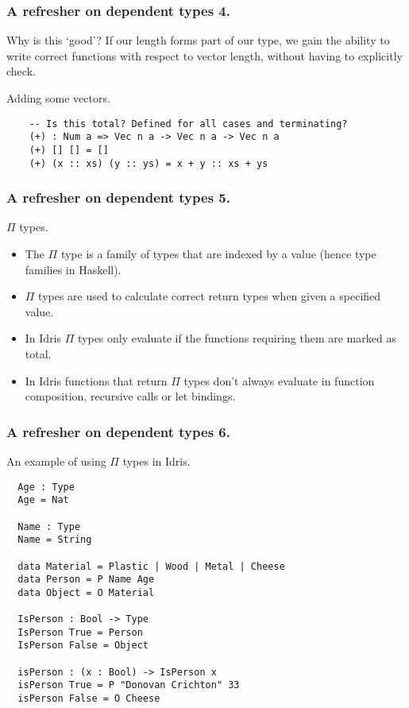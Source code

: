 \documentclass{beamer}
\begin{document}
\begin{frame}[fragile]
  \frametitle{A refresher on dependent types 4.}

  \begin{block}{Why is this `good'?}
   If our length forms part of our type, we gain the ability
          to write correct functions with respect to vector length,
          without having to explicitly check. 
  \end{block}
  \begin{block}{Adding some vectors.}
  \begin{verbatim}
    -- Is this total? Defined for all cases and terminating?
    (+) : Num a => Vec n a -> Vec n a -> Vec n a
    (+) [] [] = []
    (+) (x :: xs) (y :: ys) = x + y :: xs + ys
  \end{verbatim}
  \end{block}
\end{frame}


\begin{frame}[fragile]
  \frametitle{A refresher on dependent types 5.}
  \begin{block}{$\Pi$ types.}
    \begin{itemize}
     \item The $\Pi$ type is a family of types that are indexed by a
           value (hence type families in Haskell).
     \item $\Pi$ types are used to calculate correct return types
             when given a specified value.
     \item In Idris $\Pi$ types only evaluate if the functions
             requiring them are marked as total.
     \item In Idris functions that return $\Pi$ types don't always
       evaluate in function composition, recursive calls or let bindings.
     \end{itemize}
  \end{block}
\end{frame}

\begin{frame}[fragile]
  \frametitle{A refresher on dependent types 6.}
  \begin{block}{An example of using $\Pi$ types in Idris.}
  \begin{verbatim}
  Age : Type
  Age = Nat

  Name : Type
  Name = String

  data Material = Plastic | Wood | Metal | Cheese
  data Person = P Name Age
  data Object = O Material

  IsPerson : Bool -> Type
  IsPerson True = Person
  IsPerson False = Object

  isPerson : (x : Bool) -> IsPerson x
  isPerson True = P "Donovan Crichton" 33
  isPerson False = O Cheese
  \end{verbatim}
  \end{block}
\end{frame}
\end{document}
